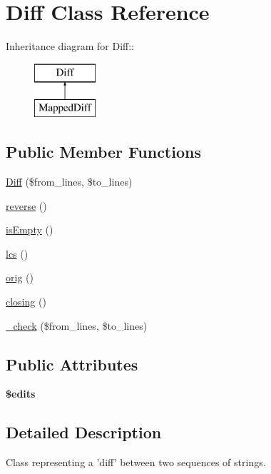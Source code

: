 \hypertarget{classDiff}{
\section{Diff Class Reference}
\label{classDiff}
}
Inheritance diagram for Diff::\begin{figure}[H]
\begin{center}
\leavevmode
\includegraphics[height=2cm]{classDiff}
\end{center}
\end{figure}
\subsection*{Public Member Functions}
\begin{CompactItemize}
\item 
\hyperlink{classDiff_b9e4cd646aac6b13f68d0eeb017a7e42}{Diff} (\$from\_\-lines, \$to\_\-lines)
\item 
\hyperlink{classDiff_4ce63c7d52bd2081787cd9603e441763}{reverse} ()
\item 
\hyperlink{classDiff_a0892a16fe2b987cdddd0a554b48d851}{isEmpty} ()
\item 
\hyperlink{classDiff_aafd3d0e3e8bd79dc39de040cf7e7005}{lcs} ()
\item 
\hyperlink{classDiff_531ed79c9805cfca36f8d827120af685}{orig} ()
\item 
\hyperlink{classDiff_be492d508c318cdaa2a031297ab046b5}{closing} ()
\item 
\hyperlink{classDiff_f7e9122d5f4ccb16a2d6b91b577ccf12}{\_\-check} (\$from\_\-lines, \$to\_\-lines)
\end{CompactItemize}
\subsection*{Public Attributes}
\begin{CompactItemize}
\item 
\hypertarget{classDiff_2b1502bdb3339780d108cd605c44b3e7}{
\textbf{\$edits}}
\label{classDiff_2b1502bdb3339780d108cd605c44b3e7}

\end{CompactItemize}


\subsection{Detailed Description}
Class representing a 'diff' between two sequences of strings. 

